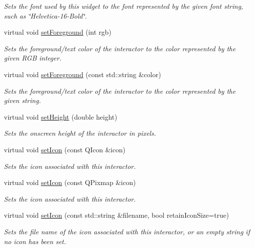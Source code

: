 \begin{DoxyCompactItemize}
\begin{DoxyCompactList}\small\item\em Sets the font used by this widget to the font represented by the given font string, such as \char`\"{}\+Helvetica-\/16-\/\+Bold\char`\"{}. \end{DoxyCompactList}\item 
virtual void \mbox{\hyperlink{classGInteractor_a9eb856b5ff83a19df3831a31f15f4563}{set\+Foreground}} (int rgb)
\begin{DoxyCompactList}\small\item\em Sets the foreground/text color of the interactor to the color represented by the given R\+GB integer. \end{DoxyCompactList}\item 
virtual void \mbox{\hyperlink{classGInteractor_af59209aeadea6dfc6d97a2d8531f50e1}{set\+Foreground}} (const std\+::string \&color)
\begin{DoxyCompactList}\small\item\em Sets the foreground/text color of the interactor to the color represented by the given string. \end{DoxyCompactList}\item 
virtual void \mbox{\hyperlink{classGInteractor_a9e280bfc4544dfaf8e4376c4e1a74357}{set\+Height}} (double height)
\begin{DoxyCompactList}\small\item\em Sets the onscreen height of the interactor in pixels. \end{DoxyCompactList}\item 
virtual void \mbox{\hyperlink{classGInteractor_a542abfcd7261751352af129c7215ecda}{set\+Icon}} (const Q\+Icon \&icon)
\begin{DoxyCompactList}\small\item\em Sets the icon associated with this interactor. \end{DoxyCompactList}\item 
virtual void \mbox{\hyperlink{classGInteractor_a368e1a338f84401c284506d03b1ba769}{set\+Icon}} (const Q\+Pixmap \&icon)
\begin{DoxyCompactList}\small\item\em Sets the icon associated with this interactor. \end{DoxyCompactList}\item 
virtual void \mbox{\hyperlink{classGInteractor_a762e139aa311461c3984d3ad28293f64}{set\+Icon}} (const std\+::string \&filename, bool retain\+Icon\+Size=true)
\begin{DoxyCompactList}\small\item\em Sets the file name of the icon associated with this interactor, or an empty string if no icon has been set. \end{DoxyCompactList}\item 

\end{DoxyCompactItemize}
